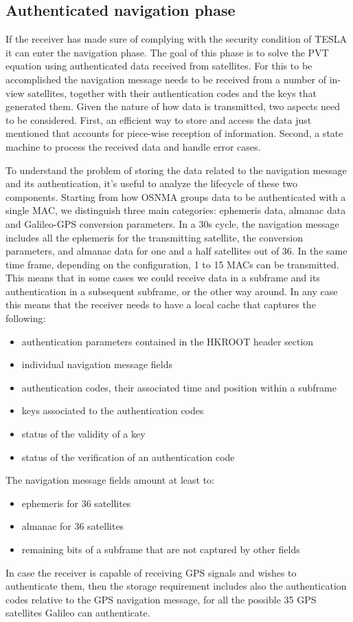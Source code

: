 \subsection{Authenticated navigation phase}
If the receiver has made sure of complying with the security condition of TESLA
it can enter the navigation phase. The goal of this phase is to solve the PVT
equation using authenticated data received from satellites. For this to be
accomplished the navigation message needs to be received from a number of
in-view satellites, together with their authentication codes and the keys that
generated them. Given the nature of how data is transmitted, two aspects need to
be considered. First, an efficient way to store and access the data just
mentioned that accounts for piece-wise reception of information. Second, a state
machine to process the received data and handle error cases.

\vspace{\baselineskip}

To understand the problem of storing the data related to the navigation message
and its authentication, it's useful to analyze the lifecycle of these two
components. Starting from how OSNMA groups data to be authenticated with a
single MAC, we distinguish three main categories: ephemeris data, almanac data
and Galileo-GPS conversion parameters. In a 30s cycle, the navigation message
includes all the ephemeris for the transmitting satellite, the conversion
parameters, and almanac data for one and a half satellites out of 36. In the
same time frame, depending on the configuration, 1 to 15 MACs can be
transmitted.  This means that in some cases we could receive data in a subframe
and its authentication in a subsequent subframe, or the other way around. In any
case this means that the receiver needs to have a local cache that captures the
following:
\begin{itemize}
  \item authentication parameters contained in the HKROOT header section
  \item individual navigation message fields
  \item authentication codes, their associated time and position within a
    subframe
  \item keys associated to the authentication codes
  \item status of the validity of a key
  \item status of the verification of an authentication code
\end{itemize}
The navigation message fields amount at least to:
\begin{itemize}
  \item ephemeris for 36 satellites
  \item almanac for 36 satellites
  \item remaining bits of a subframe that are not captured by other fields
\end{itemize}
In case the receiver is capable of receiving GPS signals and wishes to
authenticate them, then the storage requirement includes also the authentication
codes relative to the GPS navigation message, for all the possible 35 GPS
satellites Galileo can authenticate.

